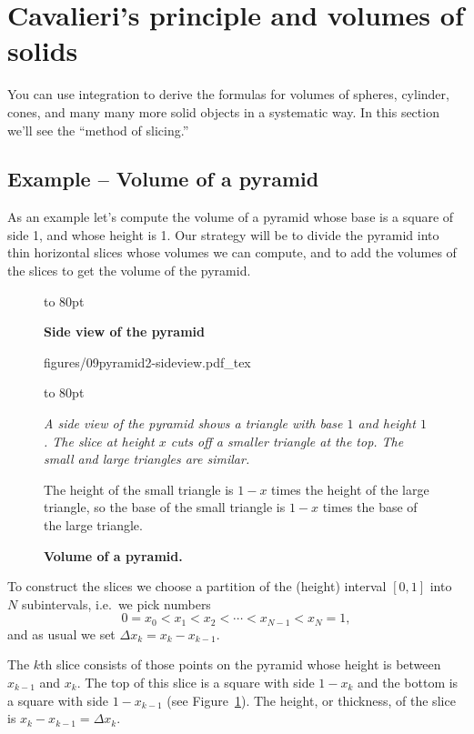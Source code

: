 \section{Cavalieri's principle and volumes of solids}
You can use integration to derive the formulas for volumes of spheres, cylinder,
cones, and many many more solid objects in a systematic way.  In this section
we'll see the ``method of slicing.''

\subsection{Example -- Volume of a pyramid}
As an example let's compute the volume of a pyramid whose base is a square of
side 1, and whose height is 1.  Our strategy will be to divide the pyramid into
thin horizontal slices whose volumes we can compute, and to add the volumes of
the slices to get the volume of the pyramid.

\begin{figure}[ht]
  \centering
  \parbox[b][80pt][t]{190pt}{ }
  \hspace{35pt}
  \begin{minipage}[t]{130pt}
    \vbox to 80pt{\sffamily%
      \centerline{\bfseries\small Side view of the pyramid} 
      figures/09pyramid2-sideview.pdf_tex } \vbox to
    80pt{\footnotesize\sffamily\itshape%
      A side view of the pyramid shows a triangle with base $1$ and height $1$.
      The slice at height $x$ cuts off a smaller triangle at the top.  The small
      and large triangles are similar.

      The height of the small triangle is $1-x$ times the height of the large
      triangle, so the base of the small triangle is $1-x$ times the base of the
      large triangle.  }
  \end{minipage}
  \caption{\textbf{Volume of a pyramid. } }
  \label{fig:09pyramid}
\end{figure}

To construct the slices we choose a partition of the (height) interval $[0, 1]$
into $N$ subintervals, i.e.\ we pick numbers
\[
0=x_0<x_1<x_2<\cdots<x_{N-1}<x_N=1,
\]
and as usual we set $\Delta x_k = x_k-x_{k-1}$.

The $k$th slice consists of those points on the pyramid whose height is between
$x_{k-1}$ and $x_k$.  The top of this slice is a square with side $1-x_k$ and
the bottom is a square with side $1-x_{k-1}$ (see Figure~\ref{fig:09pyramid}).
The height, or thickness, of the slice is $x_k-x_{k-1} = \Delta x_k$.

